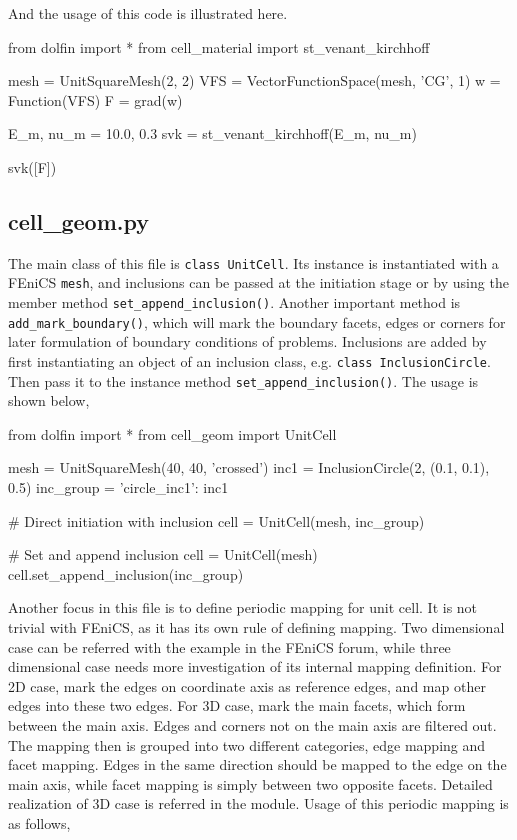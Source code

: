 \documentclass[10pt,a4paper]{scrreprt}
\begin{document}
And the usage of this code is illustrated here.
\begin{python}
from dolfin import *
from cell_material import st_venant_kirchhoff

mesh = UnitSquareMesh(2, 2)
VFS = VectorFunctionSpace(mesh, 'CG', 1)
w = Function(VFS)
F = grad(w)

E_m, nu_m = 10.0, 0.3
svk = st_venant_kirchhoff(E_m, nu_m)

svk([F])
\end{python}

\subsection{cell\_geom.py}
The main class of this file is \texttt{class UnitCell}. Its instance is instantiated with a FEniCS \texttt{mesh}, and inclusions can be passed at the initiation stage or by using the member method \texttt{set\_append\_inclusion()}. Another important method is \texttt{add\_mark\_boundary()}, which will mark the boundary facets, edges or corners for later formulation of boundary conditions of problems. Inclusions are added by first instantiating an object of an inclusion class, e.g. \texttt{class InclusionCircle}. Then pass it to the instance method \texttt{set\_append\_inclusion()}. The usage is shown below,

\begin{python}
from dolfin import *
from cell_geom import UnitCell

mesh = UnitSquareMesh(40, 40, 'crossed')
inc1 = InclusionCircle(2, (0.1, 0.1), 0.5)
inc_group = {'circle_inc1': inc1}

# Direct initiation with inclusion
cell = UnitCell(mesh, inc_group)

# Set and append inclusion
cell = UnitCell(mesh)
cell.set_append_inclusion(inc_group)
\end{python}

Another focus in this file is to define periodic mapping for unit cell. It is not trivial with FEniCS, as it has its own rule of defining mapping. Two dimensional case can be referred with the example in the FEniCS forum, while three dimensional case needs more investigation of its internal mapping definition. For 2D case, mark the edges on coordinate axis as reference edges, and map other edges into these two edges. For 3D case, mark the main facets, which form between the main axis. Edges and corners not on the main axis are filtered out. The mapping then is grouped into two different categories, edge mapping and facet mapping. Edges in the same direction should be mapped to the edge on the main axis, while facet mapping is simply between two opposite facets. Detailed realization of 3D case is referred in the module. Usage of this periodic mapping is as follows,
\end{document}
